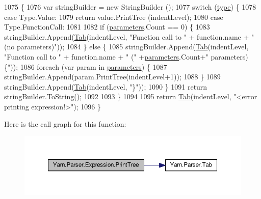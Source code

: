 \begin{DoxyCode}
1075             \{
1076                 var stringBuilder = \textcolor{keyword}{new} StringBuilder ();
1077                 \textcolor{keywordflow}{switch} (\hyperlink{a00106_ad55c92df835006328bc2a79a8f91efb9}{type}) \{
1078                 \textcolor{keywordflow}{case} Type.Value:
1079                     \textcolor{keywordflow}{return} value.PrintTree (indentLevel);
1080                 \textcolor{keywordflow}{case} Type.FunctionCall:
1081 
1082                     \textcolor{keywordflow}{if} (\hyperlink{a00106_a7b21380bead8ae08b2cfc6594edab32c}{parameters}.Count == 0) \{
1083                         stringBuilder.Append(\hyperlink{a00151_aa8fa36b46de12a1c561d77b99c4b9ae3}{Tab}(indentLevel, \textcolor{stringliteral}{"Function call to "} + \textcolor{keyword}{function}.name + \textcolor{stringliteral}{"
       (no parameters)"}));
1084                     \} \textcolor{keywordflow}{else} \{
1085                         stringBuilder.Append(\hyperlink{a00151_aa8fa36b46de12a1c561d77b99c4b9ae3}{Tab}(indentLevel, \textcolor{stringliteral}{"Function call to "} + \textcolor{keyword}{function}.name + \textcolor{stringliteral}{" ("}
       +\hyperlink{a00106_a7b21380bead8ae08b2cfc6594edab32c}{parameters}.Count+\textcolor{stringliteral}{" parameters) \{"}));
1086                         \textcolor{keywordflow}{foreach} (var param \textcolor{keywordflow}{in} \hyperlink{a00106_a7b21380bead8ae08b2cfc6594edab32c}{parameters}) \{
1087                             stringBuilder.Append(param.PrintTree(indentLevel+1));
1088                         \}
1089                         stringBuilder.Append(\hyperlink{a00151_aa8fa36b46de12a1c561d77b99c4b9ae3}{Tab}(indentLevel, \textcolor{stringliteral}{"\}"}));
1090                     \}
1091                     \textcolor{keywordflow}{return} stringBuilder.ToString();
1092 
1093                 \}
1094 
1095                 \textcolor{keywordflow}{return} \hyperlink{a00151_aa8fa36b46de12a1c561d77b99c4b9ae3}{Tab}(indentLevel, \textcolor{stringliteral}{"<error printing expression!>"});
1096             \}
\end{DoxyCode}


Here is the call graph for this function\-:
\nopagebreak
\begin{figure}[H]
\begin{center}
\leavevmode
\includegraphics[width=350pt]{a00106_a509ba6d93218203bae56a5a7a82e8261_cgraph}
\end{center}
\end{figure}


